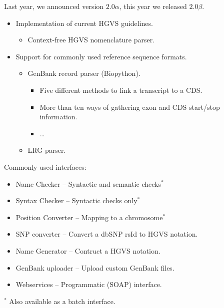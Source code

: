 \documentclass[a4, portrait]{seminar}
\begin{document}
\begin{slide}

Last year, we announced version $2.0\alpha$, this year we released $2.0\beta$.

\vspace{.5cm}
\begin{itemize}
  \item Implementation of current HGVS guidelines.
  \begin{itemize}
    \item Context-free HGVS nomenclature parser.
  \end{itemize}
  \item Support for commonly used reference sequence formats.
  \begin{itemize}
    \item GenBank record parser (Biopython).
    \begin{itemize}
      \item Five different methods to link a transcript to a CDS.
      \item More than ten ways of gathering exon and CDS start/stop information.
      \item \ldots
    \end{itemize}
    \item LRG parser.
  \end{itemize}
\end{itemize}
\vfill
\end{slide}

\begin{slide}

Commonly used interfaces:
\begin{itemize}
  \item Name Checker -- Syntactic and semantic checks$^*$
  \item Syntax Checker -- Syntactic checks only$^*$
  \item Position Converter -- Mapping to a chromosome$^*$
  \item SNP converter -- Convert a dbSNP rsId to HGVS notation.
  \item Name Generator -- Contruct a HGVS notation.
  \item GenBank uploader -- Upload custom GenBank files.
  \item Webservices -- Programmatic (SOAP) interface.
\end{itemize}
$^*$ Also available as a batch interface.
\vfill
\end{slide}
\end{document}
